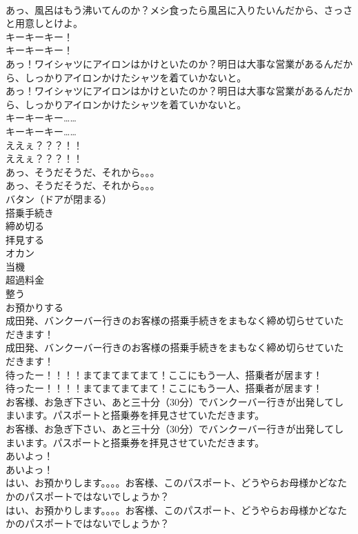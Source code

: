 \documentclass[8pt]{extreport}
\begin{document}
\begin{CJK}{UTF8}{min}
\\	あっ、風呂はもう沸いてんのか？メシ食ったら風呂に入りたいんだから、さっさと用意しとけよ。	
\\	キーキーキー！	
\\	キーキーキー！ 
\\	あっ！ワイシャツにアイロンはかけといたのか？明日は大事な営業があるんだから、しっかりアイロンかけたシャツを着ていかないと。	
\\	あっ！ワイシャツにアイロンはかけといたのか？明日は大事な営業があるんだから、しっかりアイロンかけたシャツを着ていかないと。 
\\	キーキーキー……	
\\	キーキーキー…… 
\\	ええぇ？？？！！	
\\	ええぇ？？？！！ 
\\	あっ、そうだそうだ、それから。。。	
\\	あっ、そうだそうだ、それから。。。 
\\	バタン（ドアが閉まる）	
\\	搭乗手続き
\\	締め切る
\\	拝見する
\\	オカン
\\	当機
\\	超過料金
\\	整う
\\	お預かりする
\\	成田発、バンクーバー行きのお客様の搭乗手続きをまもなく締め切らせていただきます！	
\\	成田発、バンクーバー行きのお客様の搭乗手続きをまもなく締め切らせていただきます！ 
\\	待ったー！！！！まてまてまてまて！ここにもう一人、搭乗者が居ます！	
\\	待ったー！！！！まてまてまてまて！ここにもう一人、搭乗者が居ます！ 
\\	お客様、お急ぎ下さい、あと三十分（30分）でバンクーバー行きが出発してしまいます。パスポートと搭乗券を拝見させていただきます。	
\\	お客様、お急ぎ下さい、あと三十分（30分）でバンクーバー行きが出発してしまいます。パスポートと搭乗券を拝見させていただきます。 
\\	あいよっ！	
\\	あいよっ！ 
\\	はい、お預かりします。。。。お客様、このパスポート、どうやらお母様かどなたかのパスポートではないでしょうか？	
\\	はい、お預かりします。。。。お客様、このパスポート、どうやらお母様かどなたかのパスポートではないでしょうか？ 

\end{CJK}
\end{document}
